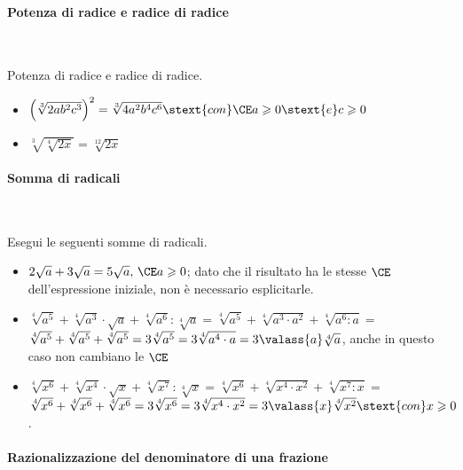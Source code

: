 \paragraph{Potenza di radice e radice di radice}~

\begin{esempio}{}{}
Potenza di radice e radice di radice.
\begin{itemize}
\item \(\left(\sqrt[3]{2ab^2c^3}\right)^2=\sqrt[3]{4a^2b^4c^6}
\stext{con} \CE a \geqslant 0 \stext{e} c \geqslant 0\)
\item \(\sqrt[3]{\sqrt[4]{2x}}=\sqrt[12]{2x}\)
\end{itemize}
\end{esempio}

\pagebreak %

\paragraph{Somma di radicali}~

\begin{esempio}{}{}
Esegui le seguenti somme di radicali.
\begin{itemize} [left=0mm]
\item \(2\sqrt a+3\sqrt a=5\sqrt a,\,\CE a \geqslant 0\);
dato che il risultato ha le stesse \(\CE\) dell'espressione iniziale, 
non è necessario esplicitarle.
\item 
\(\sqrt[4]{a^5}+\sqrt[4]{a^3}\cdot \sqrt{a} + \sqrt[4]{a^6}:\sqrt[4]{a} = 
\sqrt[4]{a^5}+\sqrt[4]{a^3\cdot a^2}+\sqrt[4]{a^6:a}=\)\\
\(\sqrt[4]{a^5}+\sqrt[4]{a^5}+\sqrt[4]{a^5}=3\sqrt[4]{a^5}=
  3\sqrt[4]{a^4\cdot a}=3 \valass{a}\sqrt[4]{a}\), 
anche in questo caso non cambiano le \(\CE\) 
\item 
\(\sqrt[4]{x^6}+\sqrt[4]{x^4}\cdot \sqrt{x} + \sqrt[4]{x^7}:\sqrt[4]{x} = 
\sqrt[4]{x^6}+\sqrt[4]{x^4\cdot x^2}+\sqrt[4]{x^7:x}=\)\\
\(\sqrt[4]{x^6}+\sqrt[4]{x^6}+\sqrt[4]{x^6} =3\sqrt[4]{x^6}=
  3\sqrt[4]{x^4\cdot x^2} = 3 \valass{x}\sqrt[4]{x^2}
  \stext{con} x \geqslant 0\). 
\end{itemize}
\end{esempio}
% 

\paragraph{Razionalizzazione del denominatore di una frazione}~


